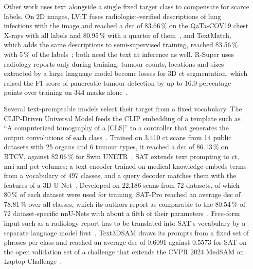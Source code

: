 Other work uses text alongside a single fixed target class to compensate for scarce labels.
On 2D images, LViT fuses radiologist-verified descriptions of lung infections with the image and reached a \gls{dsc} of 83.66\,\% on the QaTa-COV19 chest X-rays with all labels and 80.95\,\% with a quarter of them~\cite{li2023lvitlanguagemeetsvision}, and TextMatch, which adds the same descriptions to semi-supervised training, reached 83.56\,\% with 5\,\% of the labels~\cite{textmatch2024}; both need the text at inference as well.
R-Super uses radiology reports only during training: tumour counts, locations and sizes extracted by a large language model become losses for 3D \gls{ct} segmentation, which raised the F1 score of pancreatic tumour detection by up to 16.0 percentage points over training on 344 masks alone~\cite{bassi2025learningsegmentationradiologyreports}.

Several text-promptable models select their target from a fixed vocabulary.
The CLIP-Driven Universal Model feeds the CLIP embedding of a template such as ``A computerized tomography of a [CLS]'' to a controller that generates the output convolutions of each class~\cite{Liu_2023}.
Trained on 3{,}410 \gls{ct} scans from 14 public datasets with 25 organs and 6 tumour types, it reached a \gls{dsc} of 86.13\,\% on BTCV, against 82.06\,\% for Swin UNETR~\cite{Liu_2023}.
SAT extends text prompting to \gls{ct}, \gls{mri} and \gls{pet} volumes: a text encoder trained on medical knowledge embeds terms from a vocabulary of 497 classes, and a query decoder matches them with the features of a 3D U-Net~\cite{zhao2025sat}.
Developed on 22{,}186 scans from 72 datasets, of which 80\,\% of each dataset were used for training, SAT-Pro reached an average \gls{dsc} of 78.81\,\% over all classes, which its authors report as comparable to the 80.54\,\% of 72 dataset-specific nnU-Nets with about a fifth of their parameters~\cite{zhao2025sat}.
Free-form input such as a radiology report has to be translated into SAT's vocabulary by a separate language model first~\cite{zhao2025sat}.
Text3DSAM draws its prompts from a fixed set of phrases per class and reached an average \gls{dsc} of 0.6091 against 0.5573 for SAT on the open validation set of a challenge that extends the CVPR 2024 MedSAM on Laptop Challenge~\cite{text3dsam}.

